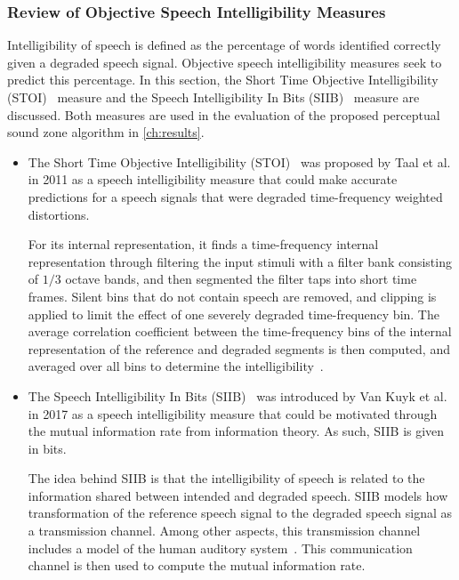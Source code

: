 \subsubsection{Review of Objective Speech Intelligibility Measures}
Intelligibility of speech is defined as the percentage of words identified correctly given a degraded speech signal.
Objective speech intelligibility measures seek to predict this percentage.
In this section, the Short Time Objective Intelligibility (STOI)~\cite{taal2011algorithm} measure and the 
Speech Intelligibility In Bits (SIIB)~\cite{van2017instrumental} measure are discussed.
Both measures are used in the evaluation of the proposed perceptual sound zone algorithm in \autoref{ch:results}.

\begin{itemize}
    \item 
    The Short Time Objective Intelligibility (STOI)~\cite{taal2011algorithm} was proposed by Taal et al. 
    in 2011 as a speech intelligibility measure that could make accurate predictions 
    for a speech signals that were degraded time-frequency weighted distortions.

    For its internal representation, it finds a time-frequency internal representation through filtering 
    the input stimuli with a filter bank consisting of 
    $1/3$ octave bands, and then segmented the filter taps into short time frames.
    Silent bins that do not contain speech are removed, and clipping is applied to limit the 
    effect of one severely degraded time-frequency bin.
    The average correlation coefficient between the time-frequency bins of the internal 
    representation of the reference and degraded 
    segments is then computed, and averaged over all bins to determine the intelligibility~\cite{taal2011algorithm}.

    \item 
    The Speech Intelligibility In Bits (SIIB)~\cite{van2017instrumental} was introduced by Van Kuyk et al.
    in 2017 as a speech intelligibility measure that could be motivated through
    the mutual information rate from information theory.
    As such, SIIB is given in bits.

    The idea behind SIIB is that the intelligibility of speech is related to the information shared between 
    intended and degraded speech.
    SIIB models how transformation of the reference speech signal to the degraded speech signal as a transmission channel.
    Among other aspects, this transmission channel includes a model of the human auditory system~\cite{van2017instrumental}.
    This communication channel is then used to compute the mutual information rate.
\end{itemize}

